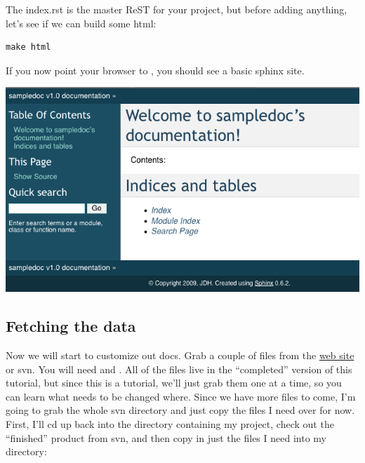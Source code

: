 \documentclass[letterpaper,10pt,english]{sphinxmanual}
\begin{document}
The index.rst is the master ReST for your project, but before adding
anything, let's see if we can build some html:

\begin{Verbatim}[commandchars=\\\{\}]
make html
\end{Verbatim}

If you now point your browser to , you
should see a basic sphinx site.

\includegraphics{basic_screenshot.png}


\subsection{Fetching the data}
\label{getting_started:id2}\label{getting_started:fetching-the-data}
Now we will start to customize out docs.  Grab a couple of files from
the \href{http://matplotlib.svn.sourceforge.net/viewvc/matplotlib/trunk/sampledoc\_tut/}{web site}
or svn.  You will need  and
.  All of the files live in the
``completed'' version of this tutorial, but since this is a tutorial,
we'll just grab them one at a time, so you can learn what needs to be
changed where.  Since we have more files to come, I'm going to grab
the whole svn directory and just copy the files I need over for now.
First, I'll cd up back into the directory containing my project, check
out the ``finished'' product from svn, and then copy in just the files I
need into my  directory:
\end{document}
